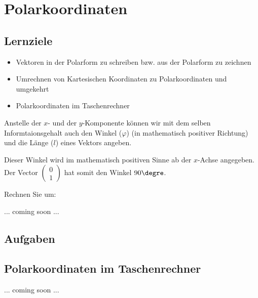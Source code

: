 
\section{Polarkoordinaten}

\subsection*{Lernziele}
\begin{itemize}
\item Vektoren in der Polarform zu schreiben bzw. aus der Polarform zu
  zeichnen
\item Umrechnen von Kartesischen Koordinaten zu Polarkoordinaten und
  umgekehrt
\item Polarkoordinaten im Taschenrechner
\end{itemize}

Anstelle der $x$- und der $y$-Komponente können wir mit dem selben
Informtaionsgehalt auch den Winkel ($\varphi$)
(in mathematisch positiver Richtung) und die Länge ($l$) eines Vektors
angeben.


Dieser Winkel wird im mathematisch positiven Sinne ab der $x$-Achse
angegeben. Der Vector
$\begin{pmatrix}0\\1\end{pmatrix}$ hat somit den Winkel $90\degre$.

Rechnen Sie um:

... coming soon ...

\subsection*{Aufgaben}

\subsection{Polarkoordinaten im Taschenrechner}

... coming soon ...
